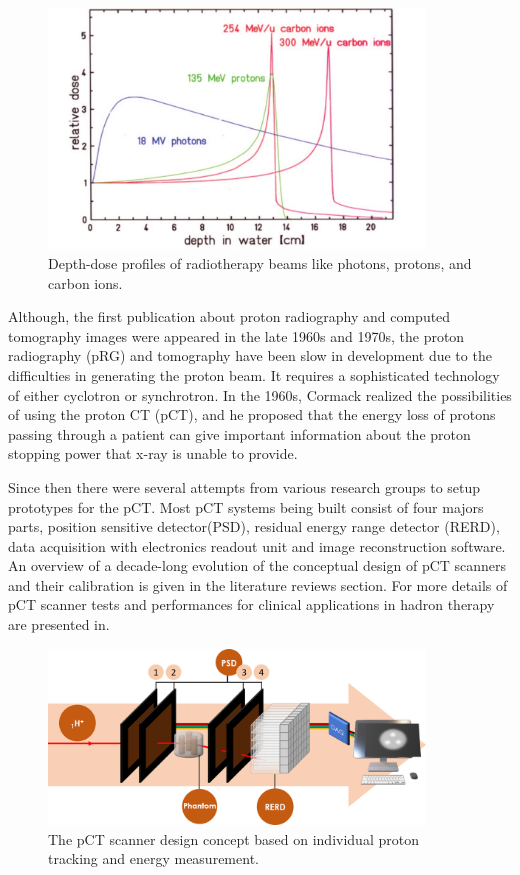 \documentclass[12pt,a4paper]{article}
\begin{document}
 \begin{figure}[hbt]
\centering
  \includegraphics[width=10cm]{figure/BraggPeak.jpg}
  \caption{Depth-dose profiles of radiotherapy beams like photons, protons, and carbon ions\cite{BraggPeakImg}.}
  \label{fig:BraggPeak}
\end{figure}
 
Although, the first publication about proton radiography and computed tomography images were appeared in the late 1960s and 1970s,  the proton radiography (pRG) and tomography have been slow in development due to the   difficulties in generating the proton beam. It requires  a  sophisticated technology of either cyclotron or synchrotron.  In the 1960s, Cormack realized the possibilities of using the proton CT (pCT), and he proposed that the energy loss of protons passing through a patient can give important information about the proton stopping power that x-ray is unable to provide\cite{pRTandPCT}. 

Since then there were several attempts from various research groups to setup  prototypes for the pCT.  Most pCT systems being built consist  of four majors parts, position sensitive detector(PSD), residual energy range  detector (RERD), data acquisition with electronics readout unit  and image reconstruction software. 
An overview of a decade-long evolution of the conceptual design of pCT scanners and their calibration is given in the literature reviews section. For more details of   pCT scanner tests and performances for clinical applications in hadron therapy are presented  in\cite{BASHKIROV2016120}.

 \begin{figure}[hbt]
 \centering
  \includegraphics[width=10cm]{figure/PCT.png}
  \caption{The pCT scanner design concept based on individual proton tracking and energy measurement.}
  \label{fig:pCT}
\end{figure}
\end{document}
